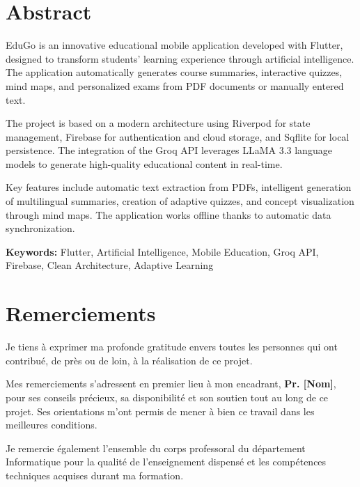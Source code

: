 \documentclass[12pt,a4paper]{report}
\begin{document}
\chapter*{Abstract}
\thispagestyle{empty}

EduGo is an innovative educational mobile application developed with Flutter, designed to transform students' learning experience through artificial intelligence. The application automatically generates course summaries, interactive quizzes, mind maps, and personalized exams from PDF documents or manually entered text.

The project is based on a modern architecture using Riverpod for state management, Firebase for authentication and cloud storage, and Sqflite for local persistence. The integration of the Groq API leverages LLaMA 3.3 language models to generate high-quality educational content in real-time.

Key features include automatic text extraction from PDFs, intelligent generation of multilingual summaries, creation of adaptive quizzes, and concept visualization through mind maps. The application works offline thanks to automatic data synchronization.

\textbf{Keywords:} Flutter, Artificial Intelligence, Mobile Education, Groq API, Firebase, Clean Architecture, Adaptive Learning

\newpage

\chapter*{Remerciements}
\thispagestyle{empty}

Je tiens à exprimer ma profonde gratitude envers toutes les personnes qui ont contribué, de près ou de loin, à la réalisation de ce projet.

Mes remerciements s'adressent en premier lieu à mon encadrant, \textbf{Pr. [Nom]}, pour ses conseils précieux, sa disponibilité et son soutien tout au long de ce projet. Ses orientations m'ont permis de mener à bien ce travail dans les meilleures conditions.

Je remercie également l'ensemble du corps professoral du département Informatique pour la qualité de l'enseignement dispensé et les compétences techniques acquises durant ma formation.
\end{document}
